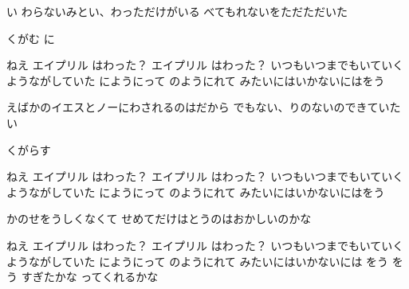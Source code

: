 \documentclass{article}
\newenvironment{Japanese}{%
\CJKfamily{min}%
\CJKtilde
\CJKnospace}{}
\begin{document}
\begin{CJK}{UTF8}{}
\begin{Japanese}
\begin{songs}{}
い
わらないみとい、わっただけがいる
べてもれないをただただいた

くがむ
に

ねえ
エイプリル
はわった？
エイプリル
はわった？
いつもいつまでもいていくようながしていた
にようにって
のようにれて
みたいにはいかないにはをう

えばかのイエスとノーにわされるのはだから
でもない、りのないのできていたい

くがらす

ねえ
エイプリル
はわった？
エイプリル
はわった？
いつもいつまでもいていくようながしていた
にようにって
のようにれて
みたいにはいかないにはをう

かのせをうしくなくて
せめてだけはとうのはおかしいのかな

ねえ
エイプリル
はわった？
エイプリル
はわった？
いつもいつまでもいていくようながしていた
にようにって
のようにれて
みたいにはいかないには
をう
をう
すぎたかな
ってくれるかな
\endverse
\endsong


\end{songs}
\end{Japanese}
\end{CJK}
\end{document}

